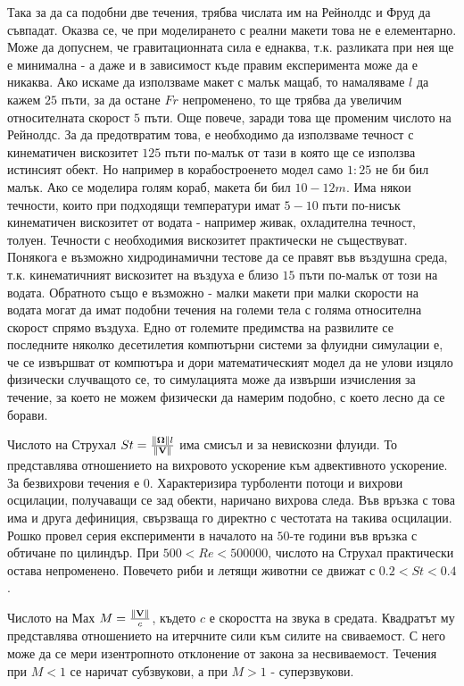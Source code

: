 \documentclass[bulgarian, 12pt]{article}
\begin{document}
Така за да са подобни две течения, трябва числата им на Рейнолдс и Фруд да съвпадат. 
Оказва се, че при моделирането с реални макети това не е елементарно. 
Може да допуснем, че гравитационната сила е еднаква, т.к. разликата при нея ще е минимална - а даже и в зависимост къде правим експеримента може да е никаква.
Ако искаме да използваме макет с малък мащаб, то намаляваме $l$ да кажем $25$ пъти, за да остане $Fr$ непроменено, то ще трябва да увеличим относителната скорост $5$ пъти.
Още повече, заради това ще променим числото на Рейнолдс. За да предотвратим това, е необходимо да използваме течност с кинематичен вискозитет $125$ пъти по-малък от тази в която ще се използва истинсият обект.
Но например в корабостроенето модел само $1:25$ не би бил малък. Ако се моделира голям кораб, макета би бил $10-12m$.
Има някои течности, които при подходящи температури имат $5-10$ пъти по-нисък кинематичен вискозитет от водата - например живак, охладителна течност, толуен.
Течности с необходимия вискозитет практически не съществуват.
Понякога е възможно хидродинамични тестове да се правят във въздушна среда, т.к. кинематичният вискозитет на въздуха е близо $15$ пъти по-малък от този на водата.
Обратното също е възможно - малки макети при малки скорости на водата могат да имат подобни течения на големи тела с голяма относителна скорост спрямо въздуха.
Едно от големите предимства на развилите се последните няколко десетилетия компютърни системи за флуидни симулации е, че се извършват от компютъра и дори математическият модел да не улови изцяло физически случващото се, то симулацията може да извърши изчисления за течение, за което не можем физически да намерим подобно, с което лесно да се борави.

Числото на Струхал $St = \frac{\norm{\bm\Omega} l}{\norm{\mathbf{V}}}$ има смисъл и за невискозни флуиди.
То представлява отношението на вихровото ускорение към адвективното ускорение.
За безвихрови течения е $0$. Характеризира турболенти потоци и вихрови осцилации, получаващи се зад обекти, наричано вихрова следа.
Във връзка с това има и друга дефиниция, свързваща го директно с честотата на такива осцилации.
Рошко провел серия експерименти в началото на $50$-те години във връзка с обтичане по цилиндър.
При $500 < Re < 500 000$, числото на Струхал практически остава непроменено.
Повечето риби и летящи животни се движат с $0.2 < St < 0.4$.

Числото на Мах $M = \frac{\norm{\mathbf{V}}}{c}$, където $c$ е скоростта на звука в средата.
Квадратът му представлява отношението на итерчните сили към силите на свиваемост.
С него може да се мери изентропното отклонение от закона за несвиваемост.
Течения при $M < 1$ се наричат субзвукови, а при $M > 1$ - суперзвукови.
\end{document}
